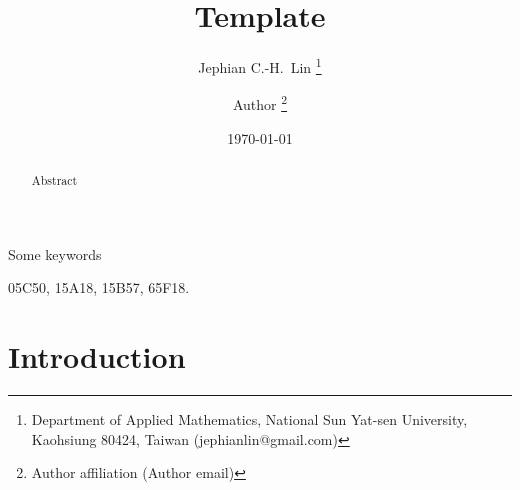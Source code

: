 \documentclass{article}
\title{Template}
\author{
Jephian C.-H.~Lin
\thanks{Department of Applied Mathematics, National Sun Yat-sen University, Kaohsiung 80424, Taiwan (jephianlin@gmail.com)}
\and 
Author
\thanks{Author affiliation (Author email)}
}
\date{\today}
\theoremstyle{definition}
\begin{document}
\maketitle


\begin{abstract}
Abstract
\end{abstract}  

Some keywords

\medskip

05C50, %
15A18, %
15B57, %
65F18. %

\section{Introduction}



{}


%
\end{document}
